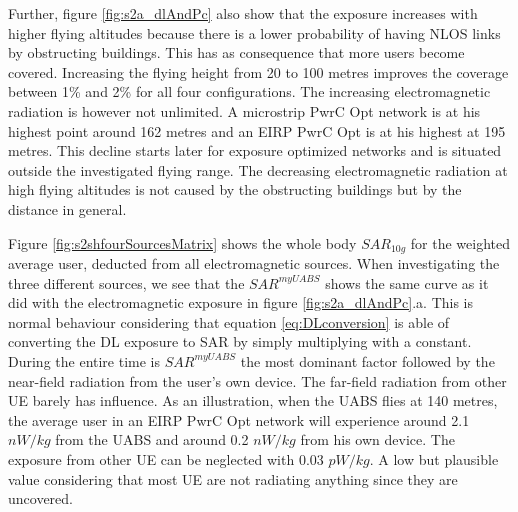 \documentclass[twocolumn]{phdsymp} %
\begin{document}
Further, figure \ref{fig:s2a_dlAndPc} also show that the exposure increases with higher flying altitudes
because there is a lower probability of having \gls{NLOS} links by obstructing buildings. This has as consequence that  
more users become covered. 
Increasing the flying height from 20 to 100 metres improves the coverage between 1\% and 2\% for all four configurations.
The increasing electromagnetic radiation is however not unlimited.
A microstrip \gls{PwrC Opt} network is at his highest point  
around 162 metres and an \gls{EIRP} \gls{PwrC Opt} is at his highest at 195 metres.
This decline starts later for exposure optimized networks and is situated outside the investigated flying range.
The decreasing electromagnetic radiation at high flying altitudes is not caused by the obstructing buildings but by the 
distance in general.

Figure \ref{fig:s2shfourSourcesMatrix} shows the whole body $SAR_{10g}$ for the weighted average user, deducted from all electromagnetic sources. 
When investigating the three different sources, we see 
that the $SAR^{myUABS}$ shows the same curve as it did with the electromagnetic exposure 
in figure \ref{fig:s2a_dlAndPc}.a. This is normal behaviour considering that equation \ref{eq:DLconversion} is able of 
converting the \gls{DL} exposure to \gls{SAR} by simply multiplying with a constant.
During the entire time is $SAR^{myUABS}$ the most dominant factor followed by 
 the near-field radiation from the user's own device.
The far-field radiation from other \gls{UE} barely has influence. 
As an illustration, when the \gls{UABS} flies at 140 metres, the average user in an \gls{EIRP} \gls{PwrC Opt} network will 
experience around  2.1 $nW/kg$ from the \gls{UABS} and around 0.2 $nW/kg$ from his own device.
The exposure from other \gls{UE} can be neglected with 0.03 $pW/kg$. A low but plausible value considering that most 
\gls{UE} are not radiating anything since they are uncovered.
\end{document}
